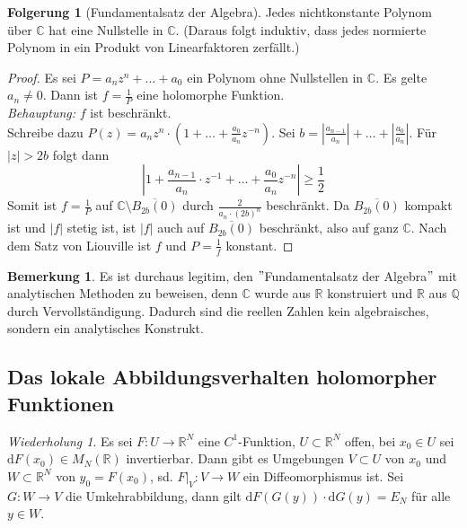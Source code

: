 \documentclass[11pt,titlepage]{article}
\theoremstyle{definition}
\newtheorem{corollary}[theorem]{Folgerung}
\newtheorem{remark}[theorem]{Bemerkung}
\theoremstyle{remark}
\newtheorem*{repetition}{Wiederholung}
\begin{document}
	\begin{corollary}[Fundamentalsatz der Algebra]
		Jedes nichtkonstante Polynom über $\mathbb{C}$ hat eine Nullstelle in $\mathbb{C}$. 
		(Daraus folgt induktiv, dass jedes normierte Polynom in ein Produkt von Linearfaktoren 
		zerfällt.)
	\end{corollary}
	
	\begin{proof}
		Es sei $P=a_n z^n +\ldots +a_0$ ein Polynom ohne Nullstellen in $\mathbb{C}$. Es gelte 
		$a_n \neq 0$. Dann ist $f=\frac{1}{P}$ eine holomorphe Funktion. \\
		\textsl{Behauptung:} $f$ ist beschränkt. \\
		Schreibe dazu $P(z)=a_n z^n \cdot (1+\ldots +\frac{a_0}{a_n} z^{-n})$. Sei 
		$b=|\frac{a_{n-1}}{a_n}|+\ldots +|\frac{a_0}{a_n}|$. Für $|z|>2b$ folgt dann
		\[ |1+\frac{a_{n-1}}{a_n}\cdot z^{-1}+\ldots +\frac{a_0}{a_n} z^{-n}|\geq\frac{1}{2} \]
		Somit ist $f=\frac{1}{P}$ auf $\mathbb{C}\setminus\overline{B_{2b}(0)}$ durch 
		$\frac{2}{a_n \cdot (2b)^n}$ beschränkt. Da $\overline{B_{2b}(0)}$ kompakt ist und 
		$|f|$ stetig ist, ist $|f|$ auch auf $\overline{B_{2b}(0)}$ beschränkt, also auf ganz $\mathbb{C}$. 
		Nach dem Satz von Liouville ist $f$ und $P=\frac{1}{f}$ konstant.
	\end{proof}
	
	\begin{remark}
		Es ist durchaus legitim, den $"$Fundamentalsatz der Algebra$"$ mit analytischen 
		Methoden zu beweisen, denn $\mathbb{C}$ wurde aus $\mathbb{R}$ konstruiert und 
		$\mathbb{R}$ aus $\mathbb{Q}$ durch Vervollständigung. Dadurch sind die reellen Zahlen 
		kein algebraisches, sondern ein analytisches Konstrukt.
	\end{remark}
	
	\subsection{Das lokale Abbildungsverhalten holomorpher Funktionen}
	
	\begin{repetition}
		Es sei $F:U\to \mathbb{R}^N$ eine $C^1$-Funktion, $U\subset \mathbb{R}^N$ offen, 
		bei $x_0 \in U$ sei $\mathrm{d}F(x_0)\in M_N (\mathbb{R})$ invertierbar. Dann gibt es 
		Umgebungen $V\subset U$ von $x_0$ und $W\subset \mathbb{R}^N$ von $y_0=F(x_0)$, 
		sd. $F|_V :V\to W$ ein Diffeomorphismus ist. Sei $G:W\to V$ die Umkehrabbildung, dann 
		gilt $\mathrm{d}F(G(y))\cdot \mathrm{d}G(y)=E_N$ für alle $y\in W$.
	\end{repetition}
	
\end{document}
